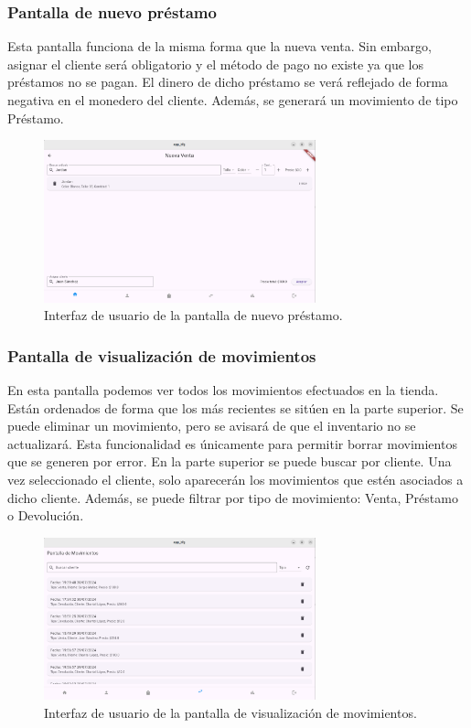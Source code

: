 \subsubsection{Pantalla de nuevo préstamo}

Esta pantalla funciona de la misma forma que la nueva venta. Sin embargo, asignar el cliente será obligatorio y el método de pago no existe ya que los préstamos no se pagan. El dinero de dicho préstamo se verá reflejado de forma negativa en el monedero del cliente. Además, se generará un movimiento de tipo Préstamo. 

\begin{figure}[H]
	\centering
	\includegraphics[width=0.7\textwidth]{imagenes/SegundaIteracion/nuevoPrestamo.png}
	\caption{Interfaz de usuario de la pantalla de nuevo préstamo.}
	\label{fig:appPantallaNuevoPrestamo}
\end{figure}

\subsubsection{Pantalla de visualización de movimientos}

En esta pantalla podemos ver todos los movimientos efectuados en la tienda. Están ordenados de forma que los más recientes se sitúen en la parte superior. Se puede eliminar un movimiento, pero se avisará de que el inventario no se actualizará. Esta funcionalidad es únicamente para permitir borrar movimientos que se generen por error. En la parte superior se puede buscar por cliente. Una vez seleccionado el cliente, solo aparecerán los movimientos que estén asociados a dicho cliente. Además, se puede filtrar por tipo de movimiento: Venta, Préstamo o Devolución. 

\begin{figure}[H]
	\centering
	\includegraphics[width=0.7\textwidth]{imagenes/SegundaIteracion/listaMovimientos.png}
	\caption{Interfaz de usuario de la pantalla de visualización de movimientos.}
	\label{fig:appPantallaVisualizarMovimientos}
\end{figure}

